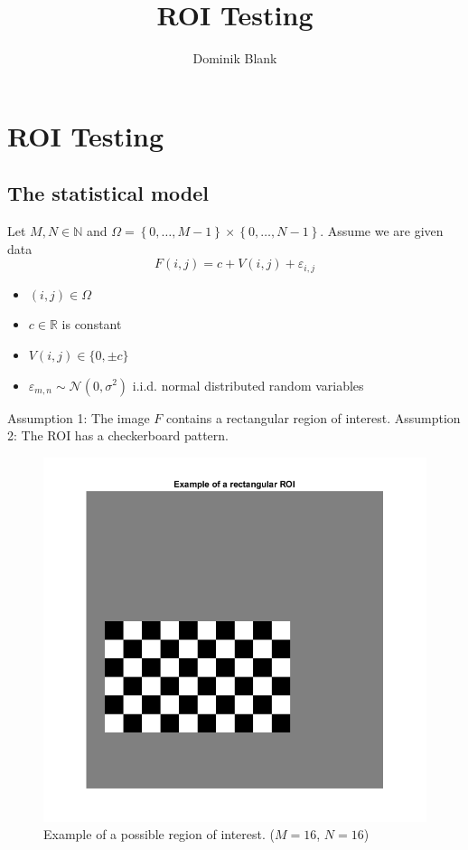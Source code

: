 \documentclass{beamer}
\author{Dominik Blank}
\title{ROI Testing}
\institute{Georg-August-Universität Göttingen}
\begin{document}
\begin{frame}
	\maketitle
\end{frame}

\begin{frame}
	\tableofcontents
\end{frame}

\section{ROI Testing}

\subsection{The statistical model}

\begin{frame}
	Let $M, N \in \mathbb{N}$ and $\Omega = \left\{ 0, \dots, M-1 \right\} \times  \left\{ 0, \dots, N-1 \right\}$. Assume we are given data
	\begin{equation*}\label{model}
		F(i, j) = c + V(i, j) + \varepsilon_{i, j}
	\end{equation*}
	\begin{itemize}
		\item $(i, j) \in \Omega$
		\item $c \in \mathbb{R}$ is constant
		\item $V(i, j) \in \{ 0, \pm c \}$
		\item $\varepsilon_{m, n} \sim \mathcal{N}(0, \sigma^2)$ i.i.d. normal distributed random variables
	\end{itemize}
	
	Assumption 1: The image $F$ contains a rectangular region of interest.
	Assumption 2: The ROI has a checkerboard pattern.
\end{frame}

\begin{frame}
	\begin{figure}
		\includegraphics[width=0.6\linewidth]{Testing/ROI}
		\caption[ROI]{Example of a possible region of interest. ($M = 16$, $N = 16$)}
		\label{fig:ROI}
	\end{figure}
\end{frame}
\end{document}
